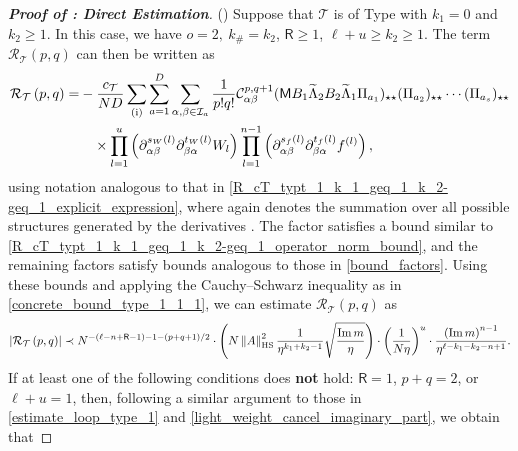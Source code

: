 \documentclass[10pt,reqno]{amsart}
\numberwithin{equation}{section}
\numberwithin{figure}{section}
\newcommand{\rmnum}[1]{\uppercase\expandafter{\romannumeral #1}}
\theoremstyle{plain} %
\theoremstyle{definition} %
\newcommand{\wt}{\widetilde}
\renewcommand{\txt}[1]{\text{\rm{#1}}}
\newcommand{\cT}{\mathcal T}
\newcommand{\cI}{\mathcal{I}}
\newcommand{\cC}{\mathcal{C}}
\newcommand{\cR}{{\mathcal R}}
\newcommand{\sM}{\mathsf M}
\newcommand{\sR}{\mathsf R}
\renewcommand{\geq}{\ge}
\newcommand{\p}[1]{({#1})}
\newcommand{\pa}[1]{\left({#1}\right)}
\newcommand{\absa}[1]{\left\lvert #1 \right\rvert}
\newcommand{\norma}[1]{\left\lVert #1 \right\rVert}
\DeclareMathOperator{\im}{\mathrm{Im}}
\newcommand{\tLambda}{{\wt{\Lambda}}}
\newcommand{\HS}{\txt{HS}}
\newcommand{\iab}{\alpha\beta}
\newcommand{\iba}{\beta\alpha}
\newcommand{\tl}{\tLambda}
\newcommand{\mm}{\ell}
\numberwithin{equation}{section}
\begin{document}
\begin{proof}[\bf Proof of : Direct Estimation]
        \noindent(\rmnum{2}) Suppose that $\cT$ is of Type \rmnum{1} with $k_1=0$ and $ k_2\geq 1$. In this case, we have $o=2,\ k_{\#}=k_2$, $\sR\geq 1$, $\mm+u\geq k_2\geq 1$. The term $\cR_{\cT}(p, q)$ can then be written as
        \begin{equation}\nonumber
            \begin{aligned}
                \cR_{\cT}\pa{p,q}=&- \frac{c_{\cT}}{ND}\sum_{\pa{\txt{i}}}\sum_{a=1}^D\sum_{\alpha,\beta\in \cI_a}\frac{1}{p!q!}\cC_{\iab}^{p,q+1}\p{\sM B_1 \tl_2 B_2\tl_1\Pi_{a_1}}_{\star\star}\p{\Pi_{a_2}}_{\star\star}\cdots\p{\Pi_{a_{s}}}_{\star\star}\\
                &\quad \times\prod_{l=1}^{u}\pa{\partial_{\iab}^{s_W\pa{l}}\partial_{\iba}^{t_W\pa{l}}W_l}\prod_{l=1}^{n-1}\pa{\partial_{\iab}^{s_f\pa{l}}\partial_{\iba}^{t_f\pa{l}}f^{\pa{l}}},
            \end{aligned}
        \end{equation}
    using notation analogous to that in \eqref{R_cT_typt_1_k_1_geq_1_k_2-geq_1_explicit_expression}, where  again denotes the summation over all possible structures generated by the derivatives \smash{$\partial_{\iab}^p\partial_{\iba}^q$}. 
        The factor \smash{$\p{\sM B_1 \tl_2 B_2\tl_1\Pi_{a_1}}_{\star\star}$} satisfies a bound similar to \eqref{R_cT_typt_1_k_1_geq_1_k_2-geq_1_operator_norm_bound}, and the remaining factors satisfy bounds analogous to those in \eqref{bound_factors}.
        Using these bounds and applying the Cauchy–Schwarz inequality as in \eqref{concrete_bound_type_1_1_1}, we can estimate $\cR_{\cT}(p, q)$ as
         \begin{equation}\label{concrete_bound_type_1_2_3}
             \begin{aligned}
                 \absa{\cR_{\cT}\pa{p,q}}\prec N^{-\pa{\mm-n+\sR-1}-1-\pa{p+q+1}/2}\cdot \pa{N\norma{A}_{\HS}^2\frac{1}{\eta^{k_1+k_2-1}}\sqrt{\frac{\im m}{\eta}}}\cdot \pa{\frac{1}{N\eta}}^{u}\cdot\frac{\pa{\im m}^{n-1}}{\eta^{\mm-k_1-k_2-n+1}}.
             \end{aligned}
         \end{equation}
         If at least one of the following conditions does {\bf not} hold: $\sR=1$, $p+q=2$, or $\mm+u=1$, then, following a similar argument to those in \eqref{estimate_loop_type_1} and \eqref{light_weight_cancel_imaginary_part}, we obtain that 

\end{proof}
\end{document}
